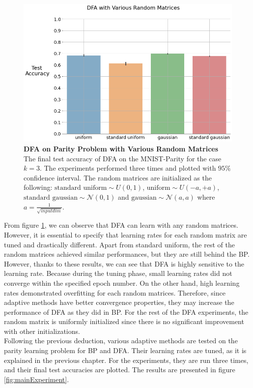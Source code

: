 \documentclass[a4paper, nobind]{templates/ociamthesis}
\begin{document}
\begin{figure}

{\centering \includegraphics[width=1\linewidth]{figures/3_k3_DFA_RandomMatrices} 

}

\caption[DFA on MNIST-Parity Problem with Various Random Matrices]{\textbf{DFA on Parity Problem with Various Random Matrices} \newline The final test accuracy of DFA on the MNIST-Parity for the case $k=3$. The experiments performed three times and plotted with $95\%$ confidence interval. The random matrices are initialized as the following: $\text{standard uniform} \sim U(0,1)$, $\text{uniform} \sim U(-a,+a)$, $\text{standard gaussian} \sim \mathcal{N}\left(0, 1\right)$ and $\text{gaussian} \sim \mathcal{N}\left(a, a \right)$ where $a= \frac{1}{\sqrt{input dim}}$.}\label{fig:DFARandomMatrices}
\end{figure}

\noindent From figure \ref{fig:DFARandomMatrices}, we can observe that DFA can learn with any random matrices. However, it is essential to specify that learning rates for each random matrix are tuned and drastically different. Apart from standard uniform, the rest of the random matrices achieved similar performances, but they are still behind the BP. However, thanks to these results, we can see that DFA is highly sensitive to the learning rate. Because during the tuning phase, small learning rates did not converge within the specified epoch number. On the other hand, high learning rates demonstrated overfitting for each random matrices. Therefore, since adaptive methods have better convergence properties, they may increase the performance of DFA as they did in BP. For the rest of the DFA experiments, the random matrix is uniformly initialized since there is no significant improvement with other initializations.\\
\noindent Following the previous deduction, various adaptive methods are tested on the parity learning problem for BP and DFA. Their learning rates are tuned, as it is explained in the previous chapter. For the experiments, they are run three times, and their final test accuracies are plotted. The results are presented in figure \ref{fig:mainExperiment}.
\end{document}
